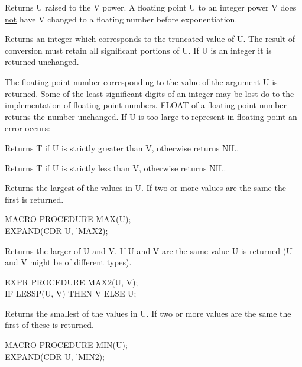\documentclass[11pt,letterpaper]{book}
\begin{document}
{Returns U raised to the V power. A floating point U to an integer
power V does \underline{not} have V changed to a floating number
before exponentiation.}


{Returns an integer which corresponds to the truncated value of U. The
result of conversion must retain all significant portions of U. If U
is an integer it is returned unchanged. }


{The floating point number corresponding to the value of the argument
U is returned. Some of the least significant digits of an integer may
be lost do to the implementation of floating point numbers. FLOAT of a
floating point number returns the number unchanged. If U is too large
to represent in floating point an error occurs:

}

{Returns T if U is strictly greater than V, otherwise returns NIL.}


{Returns T if U is strictly less than V, otherwise returns NIL. }


{Returns the largest of the values in U. If two or more values are the
same the first is returned.

{\tt \begin{tabbing} MACRO PROCEDURE MAX(U); \\
\hspace*{1em} EXPAND(CDR U, 'MAX2);
\end{tabbing}}}


{Returns the larger of U and V. If U and V are the same value U is
returned (U and V might be of different types).

{\tt \begin{tabbing} EXPR PROCEDURE MAX2(U, V); \\
\hspace*{1em} IF LESSP(U, V) THEN V ELSE U;
\end{tabbing}}}


{Returns the smallest of the values in U. If two or more values are
the same the first of these is returned.

{\tt \begin{tabbing} MACRO PROCEDURE MIN(U); \\
\hspace*{1em} EXPAND(CDR U, 'MIN2);
\end{tabbing}}}
\end{document}
